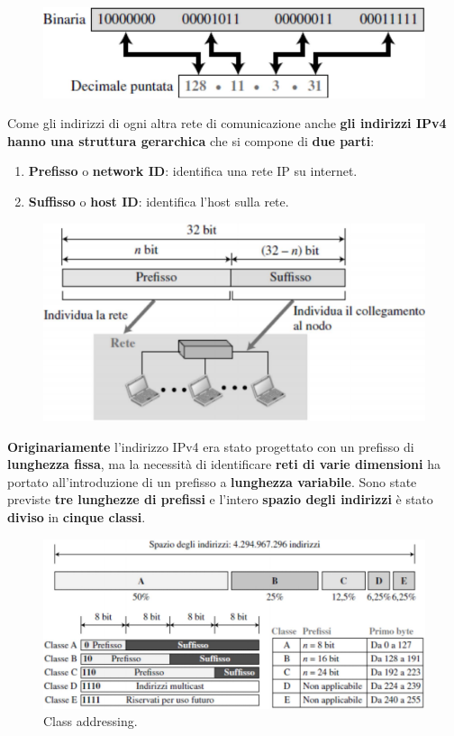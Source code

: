\documentclass[11pt,a4paper,oneside]{book}
\theoremstyle{definition}
\begin{document}
\begin{figure}[!h]
	\includegraphics[scale=0.3]{Immagini/Ip_not.png}
	\centering
\end{figure}

Come gli indirizzi di ogni altra rete di comunicazione anche \textbf{gli indirizzi IPv4 hanno una struttura gerarchica} che si compone di \textbf{due parti}:

\begin{enumerate}
	\item \textbf{Prefisso} o \textbf{network ID}: identifica una rete IP su internet.
	\item \textbf{Suffisso} o \textbf{host ID}: identifica l'host sulla rete.
\end{enumerate}

\begin{figure}[!h]
	\includegraphics[scale=0.25]{Immagini/IPv4_add.png}
	\centering
\end{figure}

\pagebreak

\textbf{Originariamente} l'indirizzo IPv4 era stato progettato con un prefisso di \textbf{lunghezza fissa}, ma la necessità di identificare \textbf{reti di varie dimensioni} ha portato all'introduzione di un prefisso a \textbf{lunghezza variabile}. Sono state previste \textbf{tre lunghezze di prefissi} e l'intero \textbf{spazio degli indirizzi} è stato \textbf{diviso} in \textbf{cinque classi}.

\begin{figure}[!h]
	\includegraphics[scale=0.35]{Immagini/IPv4_c_add.png}
	\centering
	\caption{Class addressing.}
\end{figure}
\end{document}
